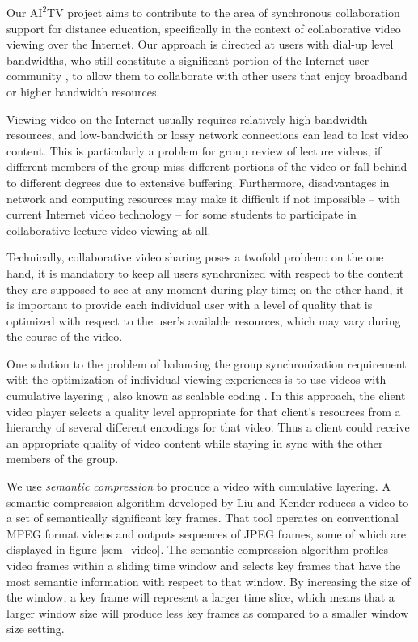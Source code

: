 \documentclass{sig-alternate}
\begin{document}
Our $\mathrm{AI}^2$TV project aims to contribute to the area of
synchronous collaboration support for distance education, specifically
in the context of collaborative video viewing over the Internet.  Our
approach is directed at users with dial-up level bandwidths, who still
constitute a significant portion of the Internet user community
\cite{DIALUP}, to allow them to collaborate with other users that
enjoy broadband or higher bandwidth resources.

Viewing video on the Internet usually requires relatively high
bandwidth resources, and low-bandwidth or lossy network connections
can lead to lost video content.  This is particularly a problem for
group review of lecture videos, if different members of the group miss
different portions of the video or fall behind to different degrees
due to extensive buffering.  Furthermore, disadvantages in network and
computing resources may make it difficult if not impossible -- with
current Internet video technology -- for some students to participate
in collaborative lecture video viewing at all.

Technically, collaborative video sharing poses a twofold problem: on
the one hand, it is mandatory to keep all users synchronized with
respect to the content they are supposed to see at any moment during
play time; on the other hand, it is important to provide each
individual user with a level of quality that is optimized with respect
to the user's available resources, which may vary during the course of
the video.

One solution to the problem of balancing the group synchronization
requirement with the optimization of individual viewing experiences is
to use videos with cumulative layering \cite{mccanne96receiverdriven},
also known as scalable coding \cite{LI}.  In this approach, the client
video player selects a quality level appropriate for that client's
resources from a hierarchy of several different encodings for that
video. Thus a client could receive an appropriate quality of video
content while staying in sync with the other members of the group.

We use {\em semantic compression} to produce a video with cumulative
layering.  A semantic compression algorithm developed by Liu and
Kender \cite{TIECHENG} reduces a video to a set of semantically
significant key frames.  That tool operates on conventional MPEG
format videos and outputs sequences of JPEG frames, some of which are
displayed in figure \ref{sem_video}.  The semantic compression
algorithm profiles video frames within a sliding time window and
selects key frames that have the most semantic information with
respect to that window.  By increasing the size of the window, a key
frame will represent a larger time slice, which means that a larger
window size will produce less key frames as compared to a smaller
window size setting.
\end{document}
